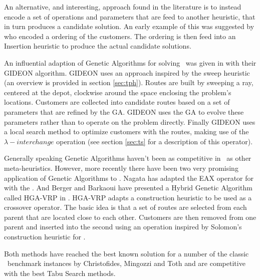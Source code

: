 
An alternative, and interesting, approach found in the literature is to instead encode a set of operations and parameters that are feed to another heuristic, that in turn produces a candidate solution. An early example of this was suggested by \cite{??} who encoded a ordering of the customers. The ordering is then feed into an Insertion heuristic to produce the actual candidate solutions.

An influential adaption of Genetic Algorithms for solving \VRPTW\ was given in \cite{TNJ:1991} with their GIDEON algorithm. GIDEON uses an approach inspired by the sweep heuristic (an overview is provided in section \ref{sec:tph}). Routes are built by sweeping a ray, centered at the depot, clockwise around the space enclosing the problem's locations. Customers are collected into candidate routes based on a set of parameters that are refined by the GA. GIDEON uses the GA to evolve these parameters rather than to operate on the problem directly. Finally GIDEON uses a local search method to optimize customers with the routes, making use of the $\lambda-interchange$ operation (see section \ref{sec:ts} for a description of this operator).

Generally speaking Genetic Algorithms haven't been as competitive in \VRP\ as other meta-heuristics. However, more recently there have been two very promising application of Genetic Algorithms to \VRP. Nagata \cite{Nagata:2007} has adapted the EAX operator for with the \VRP. And Berger and Barkaoui have presented a Hybrid Genetic Algorithm called HGA-VRP in \cite{BM:2003}. HGA-VRP adapts a construction heuristic to be used as a crossover operator. The basic idea is that a set of routes are selected from each parent that are located close to each other. Customers are then removed from one parent and inserted into the second using an operation inspired by Solomon's construction heuristic for \VRPTW \cite{Solomon:1987}.

Both methods have reached the best known solution for a number of the classic \VRP\ benchmark instances by Christofides, Mingozzi and Toth \cite{CMT:1981} and are competitive with the best Tabu Search methods.

